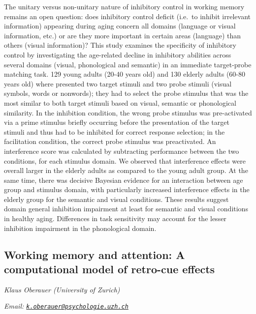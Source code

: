 \documentclass[12pt,]{book}
\begin{document}
The unitary versus non-unitary nature of inhibitory control in working memory remains an open question: does inhibitory control deficit (i.e.~to inhibit irrelevant information) appearing during aging concern all domains (language or visual information, etc.) or are they more important in certain areas (language) than others (visual information)? This study examines the specificity of inhibitory control by investigating the age-related decline in inhibitory abilities across several domains (visual, phonological and semantic) in an immediate target-probe matching task. 129 young adults (20-40 years old) and 130 elderly adults (60-80 years old) where presented two target stimuli and two probe stimuli (visual symbols, words or nonwords); they had to select the probe stimulus that was the most similar to both target stimuli based on visual, semantic or phonological similarity. In the inhibition condition, the wrong probe stimulus was pre-activated via a prime stimulus briefly occurring before the presentation of the target stimuli and thus had to be inhibited for correct response selection; in the facilitation condition, the correct probe stimulus was preactivated. An interference score was calculated by subtracting performance between the two conditions, for each stimulus domain. We observed that interference effects were overall larger in the elderly adults as compared to the young adult group. At the same time, there was decisive Bayesian evidence for an interaction between age group and stimulus domain, with particularly increased interference effects in the elderly group for the semantic and visual conditions. These results suggest domain general inhibition impairment at least for semantic and visual conditions in healthy aging. Differences in task sensitivity may account for the lesser inhibition impairment in the phonological domain.

\hypertarget{working-memory-and-attention-a-computational-model-of-retro-cue-effects}{%
\subsection{Working memory and attention: A computational model of retro-cue effects}\label{working-memory-and-attention-a-computational-model-of-retro-cue-effects}}

\emph{Klaus Oberauer (University of Zurich)}

\emph{Email: \href{mailto:k.oberauer@psychologie.uzh.ch}{\nolinkurl{k.oberauer@psychologie.uzh.ch}}}
\end{document}
